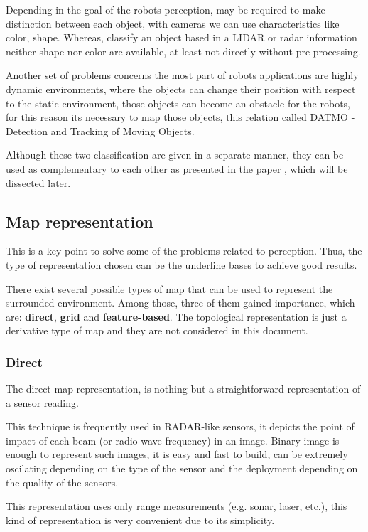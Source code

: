 Depending in the goal of the robots perception, may be required to make distinction between each object, with cameras we can use characteristics like color, shape. Whereas, classify an object based in a LIDAR or radar information neither shape nor color are available, at least not directly without pre-processing.

Another set of problems concerns the most part of robots applications are highly dynamic environments, where the objects can change their position with respect to the static environment, those objects can become an obstacle for the robots, for this reason its necessary to map those objects, this relation called DATMO - Detection and Tracking of Moving Objects.

Although these two classification are given in a separate manner, they can be used as complementary to each other as presented in the paper \cite{Wang04a}, which will be dissected later.

\subsection{Map representation}

This is a key point to solve some of the problems related to perception. Thus, the type of representation chosen can be the underline bases to achieve good results.

There exist several possible types of map that can be used to represent the surrounded environment. Among those, three of them gained importance, which are: \textbf{direct}, \textbf{grid} and \textbf{feature-based}. The topological representation is just a derivative type of map and they are not considered in this document.

\subsubsection{Direct}

The direct map representation, is nothing but a straightforward representation of a sensor reading. 

This technique is frequently used in RADAR-like sensors, it depicts the point of impact of each beam (or radio wave frequency) in an image. Binary image is enough to represent such images, it is easy and fast to build, can be extremely oscilating depending on the type of the sensor and the deployment depending on the quality of the sensors.

This representation uses only range measurements (e.g. sonar, laser, etc.), this kind of representation is very convenient due to its simplicity. 

